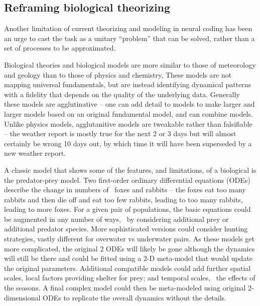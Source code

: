 \documentclass[12pt]{article}
\begin{document}
\subsection*{Reframing biological theorizing}

Another limitation of current theorizing and modeling in neural coding has been an urge to cast the task as a unitary ``problem'' that can be solved,\cite{Marr1977-yh,Marr1982-st}
rather than a set of processes to be approximated.

Biological theories and biological models are more similar to those of meteorology and geology than to those of physics and chemistry,\cite{Mulugeta2018-kc,Hunt2018-pq}
These models are not mapping universal fundamentals, but
are instead identifying dynamical patterns with a fidelity that depends on the quality of the underlying data. Generally these models are agglutinative -- one can add
detail to models to make larger and larger models based on an original fundamental model, and can combine models. Unlike physics models, agglutanitive models are tweakable
rather than falsifiable -- the weather report is mostly true for the next 2 or 3 days but will almost certainly be wrong 10 days out, by which time it will have been superseded
by a new weather report.

A classic model that shows some of the features, and limitations, of a biological is the predator-prey model. Two first-order ordinary differential equations (ODEs)
describe the change in numbers of \eg\ foxes and rabbits -- the foxes eat too many rabbits and then die off and eat too few rabbits, leading to too many rabbits, leading to
more foxes. For a given pair of populations, the basic equations could be augmented in any number of ways, \eg\ by considering additional prey or additional predator species.
More sophisticated versions could consider hunting strategies, vastly different for overwater vs underwater pairs. As these models get more
complicated, the original 2 ODEs will likely be gone although the dynamics will still be there and could be fitted using a 2-D meta-model that would update the
original parameters. Additional compatible models could add further spatial scales, local factors providing shelter for prey; and temporal scales, \eg\ the effects of the seasons.
A final complex model could then be meta-modeled using original 2-dimensional ODEs to replicate the overall dynamics without the details.
\end{document}
